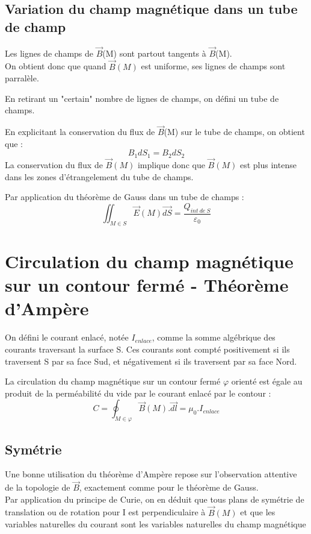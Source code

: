 \section{Variation du champ magnétique dans un tube de champ}
Les lignes de champs de $\overrightarrow{B}$(M) sont partout tangents à $\overrightarrow{B}$(M).\\
On obtient donc que quand $\overrightarrow{B}(M)$ est uniforme, ses lignes de champs sont parralèle.
\begin{de}
En retirant un "certain" nombre de lignes de champs, on défini un tube de champs.
\end{de}
\begin{prop}
En explicitant la conservation du flux de $\overrightarrow{B}$(M) sur le tube de champs, on obtient que : 
$$B_1dS_1 = B_2dS_2$$
La conservation du flux de $\overrightarrow{B}(M)$ implique donc que $\overrightarrow{B}(M)$ est plus intense dans les zones d'étrangelement du tube de champs.
\end{prop}
\begin{prop}
Par application du théorème de Gauss dans un tube de champs : 
$$\iint_{M \in S} \overrightarrow{E}(M)\overrightarrow{dS} = \dfrac{Q_{int~ de~ S}}{\varepsilon_0}$$
\end{prop}
\chapter{Circulation du champ magnétique sur un contour fermé - Théorème d'Ampère}
\begin{de}
On défini le courant enlacé, notée $I_{enlace}$, comme la somme algébrique des courants traversant la surface S. Ces courants sont compté positivement si ils traversent S par sa face Sud, et négativement si ils traversent par sa face Nord.
\end{de}

\begin{enon}
La circulation du champ magnétique sur un contour fermé $\varphi$ orienté est égale au produit de la perméabilité du vide par le courant enlacé par le contour :
$$C = \oint_{M \in \varphi}\overrightarrow{B}(M).\overrightarrow{dl} = \mu_0.I_{enlace}$$
\end{enon}
\section{Symétrie}
\begin{prop}
Une bonne utilisation du théorème d'Ampère repose sur l'observation attentive de la topologie de $\overrightarrow{B}$, exactement comme pour le théorème de Gauss.\\
Par application du principe de Curie, on en déduit que tous plans de symétrie de translation ou de rotation pour I est perpendiculaire à $\overrightarrow{B}(M)$ et que les variables naturelles du courant sont les variables naturelles du champ magnétique 
\end{prop}

